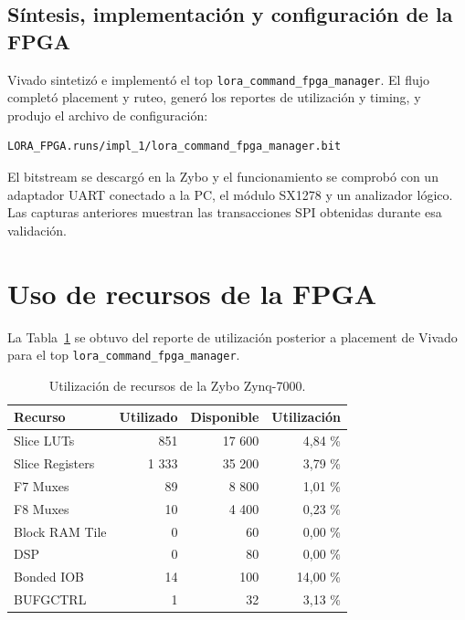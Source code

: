 \documentclass[11pt,a4paper]{article}
\newcommand{\module}[1]{\texttt{#1}}
\begin{document}
\subsection{Síntesis, implementación y configuración de la FPGA}

Vivado sintetizó e implementó el top
\module{lora\_command\_fpga\_manager}. El flujo completó placement y ruteo,
generó los reportes de utilización y timing, y produjo el archivo de
configuración:

\begin{lstlisting}
LORA_FPGA.runs/impl_1/lora_command_fpga_manager.bit
\end{lstlisting}

El bitstream se descargó en la Zybo y el funcionamiento se comprobó con un
adaptador UART conectado a la PC, el módulo SX1278 y un analizador lógico. Las
capturas anteriores muestran las transacciones SPI obtenidas durante esa
validación.

\newpage

\section{Uso de recursos de la FPGA}

La Tabla~\ref{tab:resources} se obtuvo del reporte de utilización posterior a
placement de Vivado para el top \module{lora\_command\_fpga\_manager}.

\begin{table}[H]
    \centering
    \caption{Utilización de recursos de la Zybo Zynq-7000.}
    \label{tab:resources}
    \begin{tabular}{lrrr}
        \toprule
        \textbf{Recurso} & \textbf{Utilizado} & \textbf{Disponible} & \textbf{Utilización} \\
        \midrule
        Slice LUTs       & 851   & 17 600 & 4,84 \% \\
        Slice Registers  & 1 333 & 35 200 & 3,79 \% \\
        F7 Muxes         & 89    & 8 800  & 1,01 \% \\
        F8 Muxes         & 10    & 4 400  & 0,23 \% \\
        Block RAM Tile   & 0     & 60     & 0,00 \% \\
        DSP              & 0     & 80     & 0,00 \% \\
        Bonded IOB       & 14    & 100    & 14,00 \% \\
        BUFGCTRL         & 1     & 32     & 3,13 \% \\
        \bottomrule
    \end{tabular}
\end{table}
\end{document}
